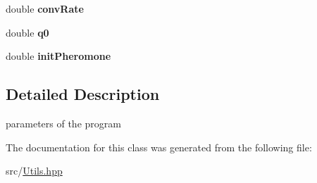 \begin{DoxyCompactItemize}
\item 
double {\bfseries conv\+Rate}\hypertarget{classUtils_1_1Parameters_a8a18219b25b4de3a7b8fc06ee264bc3a}{}\label{classUtils_1_1Parameters_a8a18219b25b4de3a7b8fc06ee264bc3a}

\item 
double {\bfseries q0}\hypertarget{classUtils_1_1Parameters_ae7b6ef8925c2415843d89aac10b204bc}{}\label{classUtils_1_1Parameters_ae7b6ef8925c2415843d89aac10b204bc}

\item 
double {\bfseries init\+Pheromone}\hypertarget{classUtils_1_1Parameters_a423447d89401ccd5977a29e33cd13087}{}\label{classUtils_1_1Parameters_a423447d89401ccd5977a29e33cd13087}

\end{DoxyCompactItemize}


\subsection{Detailed Description}
parameters of the program 

The documentation for this class was generated from the following file\+:\begin{DoxyCompactItemize}
\item 
src/\hyperlink{Utils_8hpp}{Utils.\+hpp}\end{DoxyCompactItemize}
